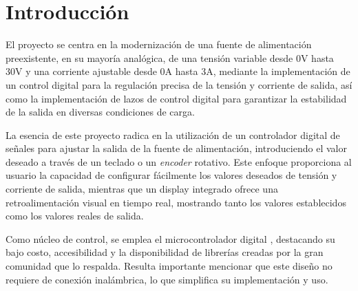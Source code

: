   \chapter{Introducción}

\label{C:introduccion}

El proyecto se centra en la modernización de una fuente de alimentación preexistente, en su mayoría analógica, de una tensión variable desde 0V hasta 30V y una corriente ajustable desde 0A hasta 3A, mediante la implementación de un control digital para la regulación precisa de la tensión y corriente de salida, así como la implementación de lazos de control digital para garantizar la estabilidad de la salida en diversas condiciones de carga. \par
La esencia de este proyecto radica en la utilización de un controlador digital de señales para ajustar la salida de la fuente de alimentación, introduciendo el valor deseado a través de un teclado o un \textit{encoder} rotativo. Este enfoque proporciona al usuario la capacidad de configurar fácilmente los valores deseados de tensión y corriente de salida, mientras que un display integrado ofrece una retroalimentación visual en tiempo real, mostrando tanto los valores establecidos como los valores reales de salida.\par
Como núcleo de control, se emplea el microcontrolador digital , destacando su bajo costo, accesibilidad y la disponibilidad de librerías creadas por la gran comunidad que lo respalda. Resulta importante mencionar que este diseño no requiere de conexión inalámbrica, lo que simplifica su implementación y uso.



